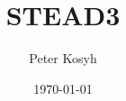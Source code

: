 \documentclass[12pt,]{book}
\title{STEAD3}
\author{Peter Kosyh}
\date{\today}
\begin{document}
\maketitle
{
\hypersetup{linkcolor=black}
\renewcommand{\contentsname}{Table of contents}
\tableofcontents
\clearpage
}

\end{document}
